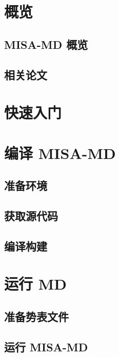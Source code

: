 
\chapter{概览}
\section{MISA-MD 概览}

\section{相关论文}


\chapter{快速入门}
\section{}


\chapter{编译 MISA-MD}
\section{准备环境}

\section{获取源代码}

\section{编译构建}


\chapter{运行 MD}
\section{准备势表文件}

\section{运行 MISA-MD}


